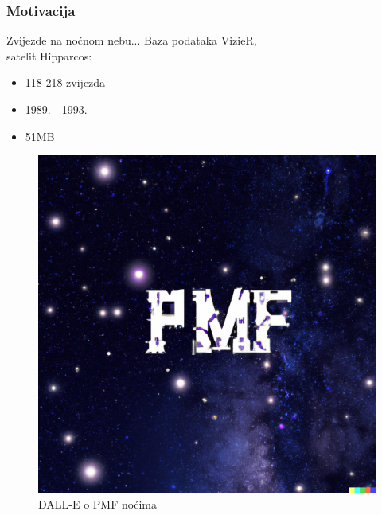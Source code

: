 




\frame{\titlepage}

\begin{frame}
  \frametitle{Motivacija}
  \begin{minipage}{0.55\linewidth}
    Zvijezde na noćnom nebu...\newline \pause
    Baza podataka VizieR,\\ satelit Hipparcos:\pause
    \begin{itemize}
      \item 118 218 zvijezda
      \item 1989. - 1993.
      \item 51MB
    \end{itemize}
    \pause
  \end{minipage}
  \begin{minipage}{0.40\linewidth}
    \begin{figure}
      \centering
      \includegraphics[width=\textwidth]{assets/prez-starry_night.png}
      \caption{DALL-E o PMF noćima} \label{fig:starry_night}
    \end{figure}
  \end{minipage}
\end{frame}

